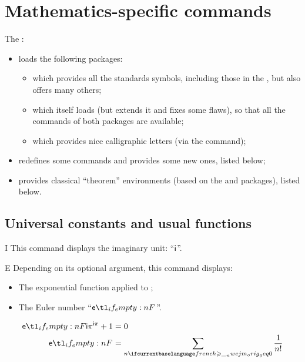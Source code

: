 \documentclass[english,nolocaltoc]{nwejmart}
\newtheorem[style=definition]{fact}
\newtheorem[title=experience]{experience}
\newtheorem[title-plural=rings]{ring}
\newtheorem[title=ideal,title-plural=ideals]{ideal}
\begin{document}
\section{Mathematics-specific commands}
\label{sec:comm-propr-aux}

The \nwejmauthorcl{}:
\begin{itemize}
\item loads the following packages:
  \begin{itemize}
  \item {} which provides all the standards symbols,
    including those in the , but also offers many others;
  \item {} which itself loads 
    (but extends it and fixes some flaws), so that all the commands of
    both packages are available;
  \item {} which provides nice calligraphic letters (via
    the  command);
  \end{itemize}
\item redefines some commands and provides some new ones, listed below;
\item provides classical \enquote{theorem} environments (based on the
   and  packages), listed below.
\end{itemize}

\subsection{Universal constants and usual functions}

\begin{docCommand}{I}{}
  This command displays the imaginary unit: \enquote{$\mathsf{i}$}.
\end{docCommand}

\begin{docCommand}{E}{}
 Depending on its optional  argument, this command displays:
  \begin{itemize}
  \item The exponential function applied to ;
  \item The Euler number \enquote{$\E$}.
  \end{itemize}
\end{docCommand}

\begin{bodycode}
\begin{align}
  \E[\I\pi]+1 & = 0 \\
  \E          & = \sum_{n\geq 0} \frac{1}{n!}
\end{align}
\end{bodycode}
\end{document}
